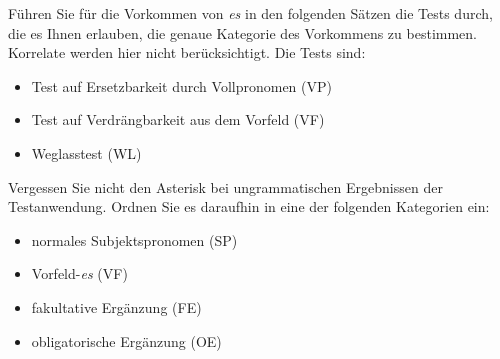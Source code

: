 Führen Sie für die Vorkommen von \textit{es} in den folgenden Sätzen die Tests durch, die es Ihnen erlauben, die genaue Kategorie des Vorkommens zu bestimmen.
Korrelate werden hier nicht berücksichtigt.
Die Tests sind:

\begin{itemize}\Lf
  \item Test auf Ersetzbarkeit durch Vollpronomen (VP)
  \item Test auf Verdrängbarkeit aus dem Vorfeld (VF)
  \item Weglasstest (WL)
\end{itemize}

Vergessen Sie nicht den Asterisk bei ungrammatischen Ergebnissen der Testanwendung.
Ordnen Sie es daraufhin in eine der folgenden Kategorien ein:

\begin{itemize}\Lf
  \item normales Subjektspronomen (SP)
  \item Vorfeld-\textit{es} (VF)
  \item fakultative Ergänzung (FE)
  \item obligatorische Ergänzung (OE)
\end{itemize}

